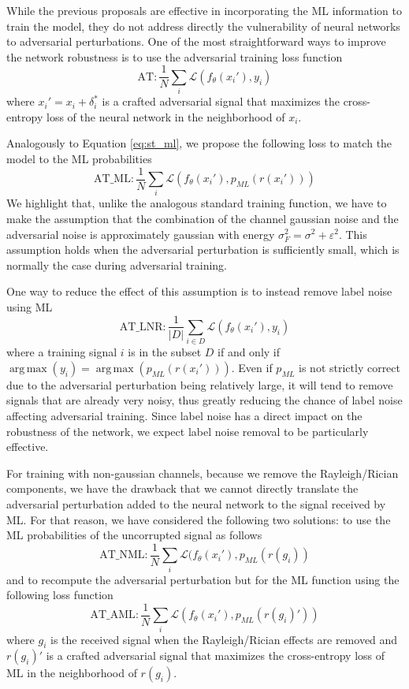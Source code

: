 \documentclass[conference]{IEEEtran}
\newcommand{\Ls}{\mathcal{L}}
\DeclareMathOperator*{\argmax}{arg\,max}
\begin{document}
While the previous proposals are effective in incorporating the ML information to train the model, they do not address directly the vulnerability of neural networks to adversarial perturbations. One of the most straightforward ways to improve the network robustness is to use the adversarial training loss function
\begin{equation}
    \text{AT} : \dfrac{1}{N}\sum_{i}\Ls(f_{\theta}(x_i'), y_i)
\end{equation}
where $x_i' = x_i + \delta_i^*$ is a crafted adversarial signal that maximizes the cross-entropy loss of the neural network in the neighborhood of $x_i$.

Analogously to Equation \ref{eq:st_ml}, we propose the following loss to match the model to the ML probabilities
\begin{equation}
    \text{AT\_ML} : \dfrac{1}{N}\sum_{i}\Ls(f_{\theta}(x_i'), p_{ML}(r(x_i')))
\end{equation}
We highlight that, unlike the analogous standard training function, we have to make the assumption that the combination of the channel gaussian noise and the adversarial noise is approximately gaussian with energy $\sigma_F^{2} = \sigma^{2} + \varepsilon^{2}$. This assumption holds when the adversarial perturbation is sufficiently small, which is normally the case during adversarial training.

One way to reduce the effect of this assumption is to instead remove label noise using ML
\begin{equation}
    \text{AT\_LNR} : \dfrac{1}{|D|}\sum_{i \in D}\Ls(f_{\theta}(x_i'), y_i)
\end{equation}
where a training signal $i$ is in the subset $D$ if and only if $\argmax(y_i) = \argmax(p_{ML}(r(x_i')))$. Even if $p_{ML}$ is not strictly correct due to the adversarial perturbation being relatively large, it will tend to remove signals that are already very noisy, thus greatly reducing the chance of label noise affecting adversarial training. Since label noise has a direct impact on the robustness of the network, we expect label noise removal to be particularly effective.

For training with non-gaussian channels, because we remove the Rayleigh/Rician components, we have the drawback that we cannot directly translate the adversarial perturbation added to the neural network to the signal received by ML. For that reason, we have considered the following two solutions: to use the ML probabilities of the uncorrupted signal as follows 
\begin{equation}
    \text{AT\_NML} : \dfrac{1}{N}\sum_{i}\Ls(f_{\theta}(x_i'), p_{ML}(r(g_i))
\label{eq:at_nml}
\end{equation}
and to recompute the adversarial perturbation but for the ML function using the following loss function
\begin{equation}
    \text{AT\_AML} : \dfrac{1}{N}\sum_{i}\Ls(f_{\theta}(x_i'), p_{ML}(r(g_i)'))
	\label{eq:at_aml}
\end{equation}
where $g_i$ is the received signal when the Rayleigh/Rician effects are removed and $r(g_i)'$ is a crafted adversarial signal that maximizes the cross-entropy loss of ML in the neighborhood of $r(g_i)$.
\end{document}

